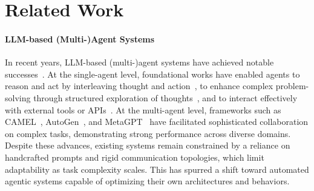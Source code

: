 \documentclass{article}
\theoremstyle{plain}
\theoremstyle{definition}
\theoremstyle{remark}
\begin{document}
\section{Related Work}
\paragraph{LLM-based (Multi-)Agent Systems}


In recent years, LLM-based (multi-)agent systems have achieved notable successes~\citep{wang_survey_2024, huang_understanding_2024, tran_multi-agent_2025}. At the single-agent level, foundational works have enabled agents to reason and act by interleaving thought and action~\citep{yao_react_2023}, to enhance complex problem-solving through structured exploration of thoughts~\citep{yao_tree_2023}, and to interact effectively with external tools or APIs~\citep{wu_avatar_nodate}. At the multi-agent level, frameworks such as CAMEL~\citep{li_camel_2023}, AutoGen~\citep{wu_autogen_2023}, and MetaGPT~\citep{hong_metagpt_2024} have facilitated sophisticated collaboration on complex tasks, demonstrating strong performance across diverse domains. Despite these advances, existing systems remain constrained by a reliance on handcrafted prompts and rigid communication topologies, which limit adaptability as task complexity scales. This has spurred a shift toward automated agentic systems capable of optimizing their own architectures and behaviors.
\end{document}
